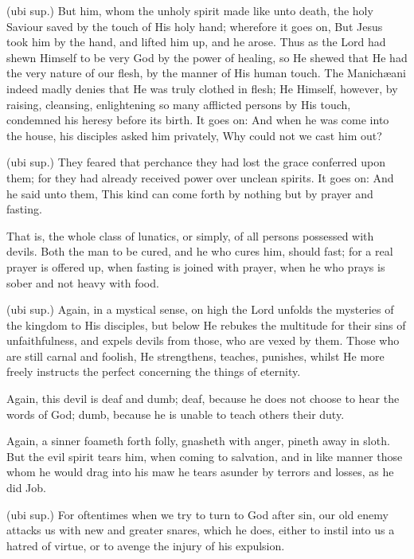  (ubi sup.) But him, whom the unholy spirit made like unto death, the holy Saviour saved by the touch of His holy hand; wherefore it goes on, But Jesus took him by the hand, and lifted him up, and he arose. Thus as the Lord had shewn Himself to be very God by the power of healing, so He shewed that He had the very nature of our flesh, by the manner of His human touch. The Manichæani indeed madly denies that He was truly clothed in flesh; He Himself, however, by raising, cleansing, enlightening so many afflicted persons by His touch, condemned his heresy before its birth. It goes on: And when he was come into the house, his disciples asked him privately, Why could not we cast him out?

 (ubi sup.) They feared that perchance they had lost the grace conferred upon them; for they had already received power over unclean spirits. It goes on: And he said unto them, This kind can come forth by nothing but by prayer and fasting.

 That is, the whole class of lunatics, or simply, of all persons possessed with devils. Both the man to be cured, and he who cures him, should fast; for a real prayer is offered up, when fasting is joined with prayer, when he who prays is sober and not heavy with food.

 (ubi sup.) Again, in a mystical sense, on high the Lord unfolds the mysteries of the kingdom to His disciples, but below He rebukes the multitude for their sins of unfaithfulness, and expels devils from those, who are vexed by them. Those who are still carnal and foolish, He strengthens, teaches, punishes, whilst He more freely instructs the perfect concerning the things of eternity.

 Again, this devil is deaf and dumb; deaf, because he does not choose to hear the words of God; dumb, because he is unable to teach others their duty.

 Again, a sinner foameth forth folly, gnasheth with anger, pineth away in sloth. But the evil spirit tears him, when coming to salvation, and in like manner those whom he would drag into his maw he tears asunder by terrors and losses, as he did Job.

 (ubi sup.) For oftentimes when we try to turn to God after sin, our old enemy attacks us with new and greater snares, which he does, either to instil into us a hatred of virtue, or to avenge the injury of his expulsion.

